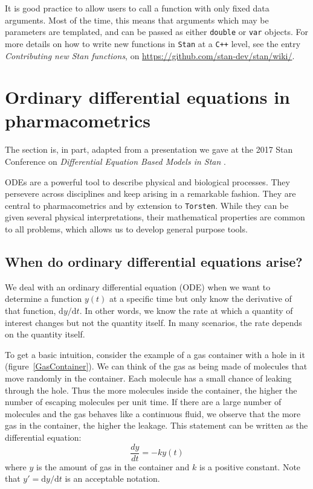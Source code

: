 \documentclass[11pt]{article}
\begin{document}
 It is good practice to allow users to call a function with only fixed data arguments.
 Most of the time, this means that arguments which may be parameters are templated, 
 and can be passed as either \texttt{double} or \texttt{var} objects.
 For more details on how to write new functions in \texttt{Stan} at a \texttt{C++}
 level, see the entry \textit{Contributing new Stan functions}, 
 on \url{https://github.com/stan-dev/stan/wiki/}.
 
 \section{Ordinary differential equations in pharmacometrics}
  
  The section is, in part, adapted from a presentation we gave at the 2017 Stan 
  Conference on \textit{Differential Equation Based Models in Stan} \cite{Margossian:2017}.
  
  ODEs are a powerful tool to describe physical and biological processes.
  They persevere across disciplines and keep arising in a remarkable fashion.
  They are central to pharmacometrics and by extension to \texttt{Torsten}. 
  While they can be given several physical interpretations, their mathematical properties 
  are common to all problems, which allows us to develop general purpose tools.

  \subsection{When do ordinary differential equations arise?}

  We deal with an ordinary differential equation (ODE) when we want to determine a
  function $y(t)$ at a specific time but only know the derivative of that function, $\mathrm{d}y/\mathrm{d}t$.
  In other words, we know the rate at which a quantity of interest changes but not the quantity 
  itself. In many scenarios, the rate depends on the quantity itself.

  To get a basic intuition, consider the example of a gas container with a hole in it  
  (figure~\ref{GasContainer}). We can think of the gas as being made of molecules that move 
  randomly in the container. Each molecule has a small chance of leaking through the hole. Thus
  the more molecules inside the container, the higher the number of escaping molecules per unit
  time. If there are a large number of molecules and the gas behaves like a continuous fluid, we
  observe that the more gas in the container, the higher the leakage. This statement can be 
  written as the differential equation:
  $$ \frac{dy}{dt} = -ky(t)$$
  where $y$ is the amount of gas in the container and $k$ is a positive constant. Note
  that $y' = \mathrm{d}y/\mathrm{d}t$ is an acceptable notation.
\end{document}
